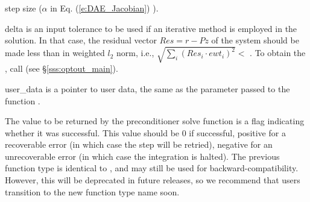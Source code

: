 {{\begin{args}
    step size ($\alpha$ in Eq. (\ref{e:DAE_Jacobian}) ).
  \item[delta]
    is an input tolerance to be used if an iterative method
    is employed in the solution.  In that case, the residual
    vector $Res = r - P z$ of the system should be made less than
     in weighted $l_2$ norm,
    i.e., $\sqrt{\sum_i (Res_i \cdot ewt_i)^2 } <$ .
    To obtain the  , call 
    (see \S\ref{sss:optout_main}).
  \item[user\_data]
    is a pointer to user data, the same as the 
    parameter passed to the function .
  \end{args}
}
{
  The value to be returned by the preconditioner solve function is a flag
  indicating whether it was successful.  This value should be $0$ if successful,
  positive for a recoverable error (in which case the step will be retried),
  negative for an unrecoverable error (in which case the integration is halted).
}
{
  The previous function type  is identical to
  , and may still be used for backward-compatibility.
  However, this will be deprecated in future releases, so we recommend
  that users transition to the new function type name soon.
}
}
